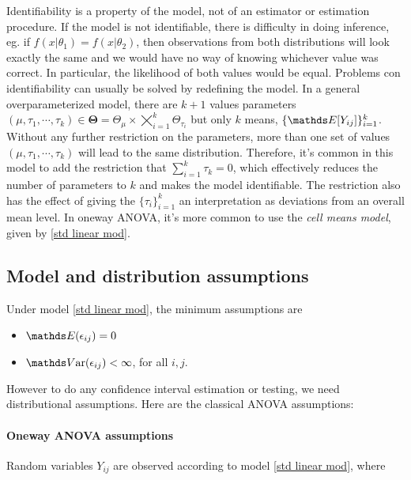 \documentclass{homework}
\begin{document}
Identifiability is a property of the model, not of an estimator or estimation procedure. If the model is not identifiable, there is difficulty in doing inference, eg. if $f(x|\theta_1) = f(x|\theta_2)$, then observations from both distributions will look exactly the same and we would have no way of knowing whichever value was correct. In particular, the likelihood of both values would be equal. Problems con identifiability can usually be solved by redefining the model. In a general overparameterized model, there are $k+1$ values parameters $(\mu, \tau_{1}, \cdots, \tau_k) \in \bm{\Theta} = \Theta_{\mu} \times \bigtimes\limits_{i=1}^k \Theta_{\tau_{i}}$ but only $k$ means, $\{\E[Y_{ij}]\}_{i=1}^{k}$. Without any further restriction on the parameters, more than one set of values $(\mu, \tau_{1}, \cdots, \tau_k)$ will lead to the same distribution. Therefore, it's common in this model to add the restriction that $\sum_{i=1}^{k} \tau_k = 0$, which effectively reduces the number of parameters to $k$ and makes the model identifiable. The restriction also has the effect of giving the $\{\tau_i\}_{i=1}^k$ an interpretation as deviations from an overall mean level. In oneway ANOVA, it's more common to use the \textit{cell means model}, given by \eqref{std linear mod}. \\

\subsection{Model and distribution assumptions}

Under model \eqref{std linear mod}, the minimum assumptions are

\begin{itemize}
    \item $\E (\epsilon_{ij}) = 0$
    \item $\var (\epsilon_{ij}) < \infty$, for all $i,j$. 
\end{itemize}

However to do any confidence interval estimation or testing, we need distributional assumptions. Here are the classical ANOVA assumptions: \\

\paragraph{\textbf{Oneway ANOVA assumptions}}

Random variables $Y_{ij}$ are observed according to model \eqref{std linear mod}, where
\end{document}
